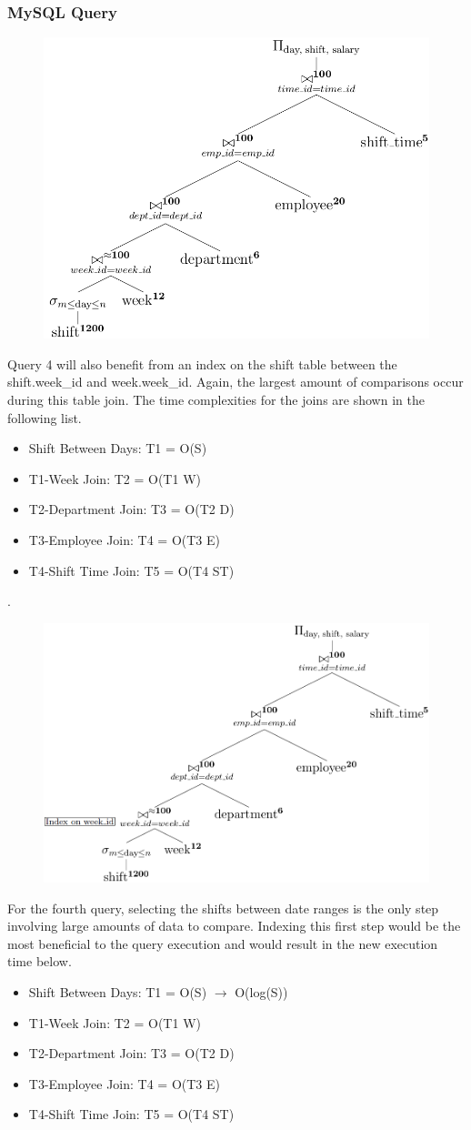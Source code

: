 \documentclass[letter,12pt]{texMemo}
\begin{document}
\subsubsection*{MySQL Query}
	
\begin{figure}[H]
	\centering
	\includegraphics[width=.5\textwidth]{query4.png}
\end{figure}
Query 4 will also benefit from an index on the shift table between the shift.week\_id and week.week\_id. Again, the largest amount of comparisons occur during this table join. The time complexities for the joins are shown in the following list.
\begin{itemize}[noitemsep,nolistsep]
	\item Shift Between Days: T1 = O(S)
	\item T1-Week Join: T2 = O(T1 W) 
	\item T2-Department Join: T3 = O(T2 D)
	\item T3-Employee Join: T4 = O(T3 E)
	\item T4-Shift Time Join: T5 = O(T4 ST)
\end{itemize}

.\begin{figure}[H]
	\centering
	\includegraphics[width=.5\textwidth]{query4_indexed.png}
\end{figure}
For the fourth query, selecting the shifts between date ranges is the only step involving large amounts of data to compare. Indexing this first step would be the most beneficial to the query execution and would result in the new execution time below.
\begin{itemize}[noitemsep,nolistsep]
	\item Shift Between Days: T1 = O(S) $\rightarrow$ O(log(S))
	\item T1-Week Join: T2 = O(T1 W) 
	\item T2-Department Join: T3 = O(T2 D)
	\item T3-Employee Join: T4 = O(T3 E)
	\item T4-Shift Time Join: T5 = O(T4 ST)
\end{itemize}
\newpage
\end{document}
